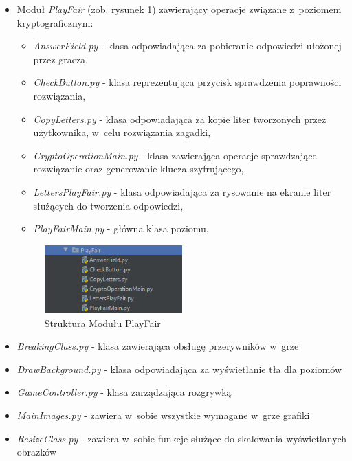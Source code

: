 \documentclass[12pt,a4paper,oneside]{book}
\theoremstyle{definition}
\numberwithin{equation}{chapter}
\begin{document}
\begin{itemize}
        \item Moduł \textit{PlayFair} (zob. rysunek \ref{StrukturaPlayFair}) zawierający operacje związane z~poziomem kryptograficznym:
        \begin{itemize}
            \item \textit{AnswerField.py} - klasa odpowiadająca za pobieranie odpowiedzi ułożonej przez gracza,
            \item \textit{CheckButton.py} - klasa reprezentująca przycisk sprawdzenia poprawności rozwiązania,
            \item \textit{CopyLetters.py} - klasa odpowiadająca za kopie liter tworzonych przez użytkownika, w~celu rozwiązania zagadki,
            \item \textit{CryptoOperationMain.py} - klasa zawierająca operacje sprawdzające rozwiązanie oraz generowanie klucza szyfrującego,
            \item \textit{LettersPlayFair.py} - klasa odpowiadająca za rysowanie na ekranie liter służących do tworzenia odpowiedzi,
            \item \textit{PlayFairMain.py} - główna klasa poziomu,
        \end{itemize}
        \begin{figure}[hpt!]
            \centering
            \includegraphics[width=0.5\textwidth]{ProjectStructure/strukturaplayfair.png}
            \caption{Struktura Modułu PlayFair}
            \label{StrukturaPlayFair}
        \end{figure}
    \item \textit{BreakingClass.py} - klasa zawierająca obsługę przerywników w~grze
    \item \textit{DrawBackground.py} - klasa odpowiadająca za wyświetlanie tła dla poziomów
    \item \textit{GameController.py} - klasa zarządzająca rozgrywką
    \item \textit{MainImages.py} - zawiera w~sobie wszystkie wymagane w~grze grafiki
    \item \textit{ResizeClass.py} - zawiera w~sobie funkcje służące do skalowania wyświetlanych obrazków
\end{itemize}
\newpage
\end{document}
